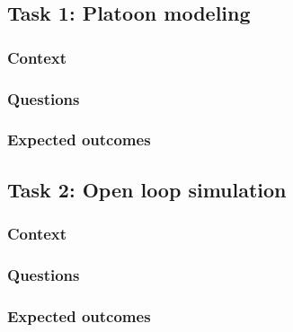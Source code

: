 \documentclass[]{book}
\theoremstyle{definition}
\theoremstyle{definition}
\theoremstyle{definition}
\theoremstyle{remark}
\begin{document}
\hypertarget{task-1-platoon-modeling}{%
\subsection*{Task 1: Platoon modeling}\label{task-1-platoon-modeling}}

\hypertarget{context-5}{%
\subsubsection*{Context}\label{context-5}}

\hypertarget{questions-4}{%
\subsubsection*{Questions}\label{questions-4}}

\hypertarget{expected-outcomes-4}{%
\subsubsection*{Expected outcomes}\label{expected-outcomes-4}}

\hypertarget{task-2-open-loop-simulation}{%
\subsection*{Task 2: Open loop
simulation}\label{task-2-open-loop-simulation}}

\hypertarget{context-6}{%
\subsubsection*{Context}\label{context-6}}

\hypertarget{questions-5}{%
\subsubsection*{Questions}\label{questions-5}}

\hypertarget{expected-outcomes-5}{%
\subsubsection*{Expected outcomes}\label{expected-outcomes-5}}
\end{document}
